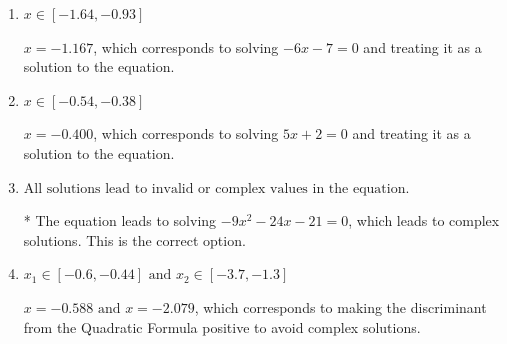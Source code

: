 \documentclass{extbook}[14pt]
\begin{document}
\begin{enumerate}
{\begin{enumerate}[label=\Alph*.]
$x = -1.167 \text{ and } x = -0.400$, which corresponds to solving $-6x -7 = 0$ and $5x + 2 = 0$ and treating them as solutions to the equation.
\item \( x \in [-1.64,-0.93] \)

$x = -1.167$, which corresponds to solving $-6x -7 = 0$ and treating it as a solution to the equation.
\item \( x \in [-0.54,-0.38] \)

$x = -0.400$, which corresponds to solving $5x + 2 = 0$ and treating it as a solution to the equation.
\item \( \text{All solutions lead to invalid or complex values in the equation.} \)

* The equation leads to solving $-9x^{2} -24 x -21=0$, which leads to complex solutions. This is the correct option.
\item \( x_1 \in [-0.6, -0.44] \text{ and } x_2 \in [-3.7,-1.3] \)

$x = -0.588 \text{ and } x = -2.079$, which corresponds to making the discriminant from the Quadratic Formula positive to avoid complex solutions.
\end{enumerate}

}
\end{enumerate}
\end{document}
